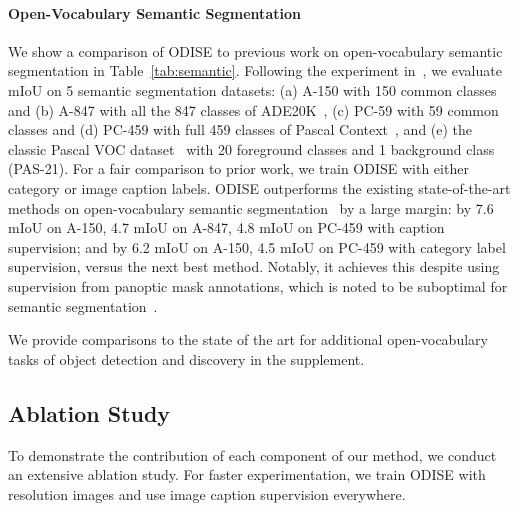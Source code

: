 \documentclass[10pt,twocolumn,letterpaper]{article}
\newcommand{\ourmethod}{ODISE}
\begin{document}
\paragraph{Open-Vocabulary Semantic Segmentation}
We show a comparison of \ourmethod{} to previous work on open-vocabulary semantic segmentation in Table~\ref{tab:semantic}. 
Following the experiment in~\cite{ghiasi2021open}, we evaluate mIoU on 5 semantic segmentation datasets: (a) A-150 with 150 common classes and (b) A-847 with all the 847 classes of ADE20K~\cite{zhou2019ade}, (c) PC-59 with 59 common classes and (d) PC-459 with full 459 classes of Pascal Context~\cite{mottaghi2014ctx}, and (e) the classic Pascal VOC dataset~\cite{everingham2010pascal} with 20 foreground classes and 1 background class (PAS-21).
For a fair comparison to prior work, we train \ourmethod{} with either category or image caption labels. 
\ourmethod{} outperforms the existing state-of-the-art methods on open-vocabulary semantic segmentation~\cite{ghiasi2021open, ding2022open} by a large margin: by 7.6 mIoU on A-150, 4.7 mIoU on A-847, 4.8 mIoU on PC-459 with caption supervision; and by 6.2 mIoU on A-150, 4.5 mIoU on PC-459 with category label supervision, versus the next best method.
Notably, it achieves this despite using supervision from panoptic mask annotations, which is noted to be suboptimal for semantic segmentation~\cite{cheng2022mask2former}. 

We provide comparisons to the state of the art for additional open-vocabulary tasks of object detection and discovery in the supplement.

\subsection{Ablation Study}

To demonstrate the contribution of each component of our method, we conduct an extensive ablation study. 
For faster experimentation, we train \ourmethod{} with  resolution images and use image caption supervision everywhere. 
\end{document}
